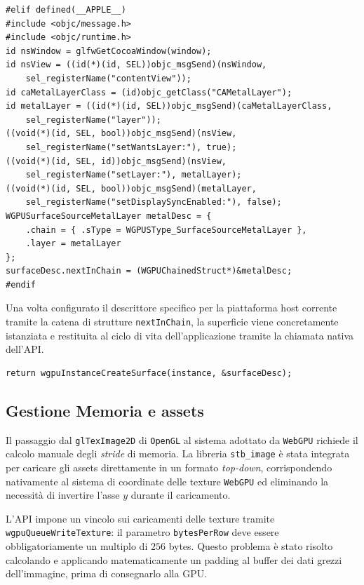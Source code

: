 \documentclass[a4paper, 11pt, twoside]{report}
\begin{document}
\begin{listing}[!ht]
\begin{verbatim}
#elif defined(__APPLE__)
#include <objc/message.h>
#include <objc/runtime.h>
id nsWindow = glfwGetCocoaWindow(window);
id nsView = ((id(*)(id, SEL))objc_msgSend)(nsWindow, 
    sel_registerName("contentView"));
id caMetalLayerClass = (id)objc_getClass("CAMetalLayer");
id metalLayer = ((id(*)(id, SEL))objc_msgSend)(caMetalLayerClass,
    sel_registerName("layer"));
((void(*)(id, SEL, bool))objc_msgSend)(nsView,
    sel_registerName("setWantsLayer:"), true);
((void(*)(id, SEL, id))objc_msgSend)(nsView,
    sel_registerName("setLayer:"), metalLayer);
((void(*)(id, SEL, bool))objc_msgSend)(metalLayer,
    sel_registerName("setDisplaySyncEnabled:"), false);
WGPUSurfaceSourceMetalLayer metalDesc = {
    .chain = { .sType = WGPUSType_SurfaceSourceMetalLayer },
    .layer = metalLayer
};
surfaceDesc.nextInChain = (WGPUChainedStruct*)&metalDesc;
#endif
\end{verbatim}
\vspace{-0.75cm}
\caption{Inizializzazione contesto finestra (macOS)}
\label{listing:macwinctx}
\end{listing}

Una volta configurato il descrittore specifico per la piattaforma host corrente tramite la catena di strutture
\texttt{\gls{nextInChain}}, la superficie viene concretamente istanziata e restituita al ciclo di vita dell'applicazione
tramite la chiamata nativa dell'API.

\begin{verbatim}
return wgpuInstanceCreateSurface(instance, &surfaceDesc);
\end{verbatim}

\pagebreak

\subsection{Gestione Memoria e assets}

Il passaggio dal \texttt{glTexImage2D} di \texttt{OpenGL} al sistema adottato da \texttt{WebGPU} richiede il calcolo
manuale degli \textit{stride} di memoria. La libreria \texttt{stb\_image} è stata integrata per caricare gli assets
direttamente in un formato \textit{top-down}, corrispondendo nativamente al sistema di coordinate delle texture
\texttt{WebGPU} ed eliminando la necessità di invertire l'asse $y$ durante il caricamento.

L'API impone un vincolo sui caricamenti delle texture tramite \texttt{wgpuQueueWriteTexture}: il parametro
\texttt{bytesPerRow} deve essere obbligatoriamente un multiplo di $256$ bytes. Questo problema è stato risolto
calcolando e applicando matematicamente un padding al buffer dei dati grezzi dell'immagine, prima di consegnarlo alla
GPU.
\end{document}
